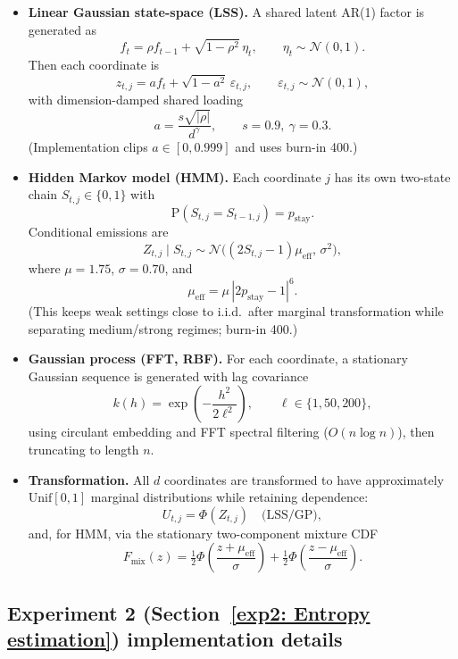 \documentclass[12pt]{article}
\renewcommand{\Pr}{\mathrm{P}}
\theoremstyle{definition}
\begin{document}
\begin{itemize}
\item \textbf{Linear Gaussian state-space (LSS).}
A shared latent AR(1) factor is generated as
\[
f_t=\rho f_{t-1}+\sqrt{1-\rho^2}\,\eta_t,\qquad \eta_t\sim\mathcal N(0,1).
\]
Then each coordinate is
\[
z_{t,j}=a f_t+\sqrt{1-a^2}\,\varepsilon_{t,j},\qquad \varepsilon_{t,j}\sim\mathcal N(0,1),
\]
with dimension-damped shared loading
\[
a=\frac{s\sqrt{|\rho|}}{d^\gamma},\qquad s=0.9,\ \gamma=0.3.
\]
(Implementation clips $a\in[0,0.999]$ and uses burn-in 400.)

\item \textbf{Hidden Markov model (HMM).}
Each coordinate $j$ has its own two-state chain $S_{t,j}\in\{0,1\}$ with
\[
\Pr(S_{t,j}=S_{t-1,j})=p_{\mathrm{stay}}.
\]
Conditional emissions are
\[
Z_{t,j}\mid S_{t,j}\sim \mathcal N \big((2S_{t,j}-1)\mu_{\mathrm{eff}},\,\sigma^2\big),
\]
where $\mu=1.75$, $\sigma=0.70$, and
\[
\mu_{\mathrm{eff}}=\mu\,|2p_{\mathrm{stay}}-1|^6.
\]
(This keeps weak settings close to i.i.d.\ after marginal transformation while separating medium/strong regimes; burn-in 400.)

\item \textbf{Gaussian process (FFT, RBF).}
For each coordinate, a stationary Gaussian sequence is generated with lag covariance
\[
k(h)=\exp \left(-\frac{h^2}{2\ell^2}\right),\qquad \ell\in\{1,50,200\},
\]
using circulant embedding and FFT spectral filtering ($O(n\log n)$), then truncating to length $n$.

\item \textbf{Transformation.}
All $d$ coordinates are transformed to have approximately $\mathrm{Unif}[0,1]$ marginal distributions while retaining dependence:
\[
U_{t,j}=\Phi(Z_{t,j}) \quad \text{(LSS/GP)},
\]
and, for HMM, via the stationary two-component mixture CDF
\[
F_{\mathrm{mix}}(z)=\tfrac12\Phi \left(\frac{z+\mu_{\mathrm{eff}}}{\sigma}\right)
+\tfrac12\Phi \left(\frac{z-\mu_{\mathrm{eff}}}{\sigma}\right).
\]
\end{itemize}

\subsection{Experiment 2 (Section~\ref{exp2: Entropy estimation}) implementation details}
\label{app: Experiment 2 implementation details}
\end{document}
